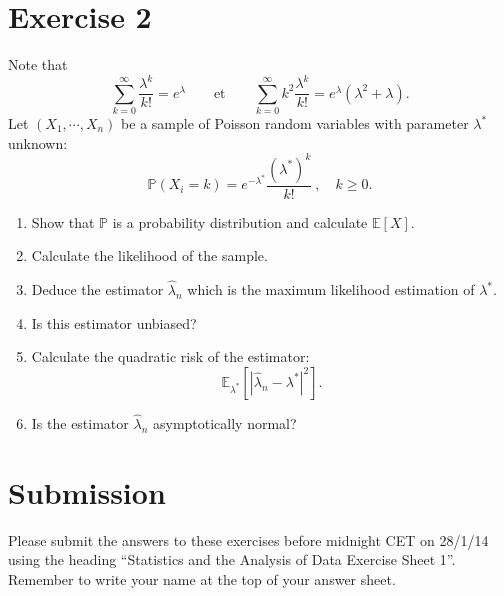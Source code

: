 \documentclass[a4paper,10pt]{article}
\begin{document}
\section*{Exercise 2}

Note that  
$$\sum_{k=0}^\infty \frac{\lambda^k}{k!} = e^\lambda\qquad\textrm{et}\qquad \sum_{k=0}^\infty k^2 \frac{ \lambda^k}{k!}=e^{\lambda}(\lambda^2 + \lambda).
$$ 
Let $(X_1,\cdots, X_n)$ be a sample of Poisson random variables with parameter $\lambda^*$ unknown:
$$
\mathbb{P}(X_i=k) = e^{-\lambda^*} \frac{(\lambda^*)^k}{k!}\ ,\quad k\ge 0.
$$
\begin{enumerate}
\item Show that $\mathbb{P}$ is a probability distribution and calculate $\mathbb{E}[X]$.
\item Calculate the likelihood of the sample. 
\item Deduce the estimator $\hat{\lambda}_n$ which is the maximum likelihood estimation of $\lambda^*$.
\item Is this estimator unbiased? 
\item Calculate the quadratic risk of the estimator:
$$
\mathbb{E}_{\lambda^*}\left[ \left| \hat \lambda_n -\lambda^*\right|^2\right].
$$
\item Is the estimator $\hat \lambda_n$  asymptotically normal?
\end{enumerate}

\section*{Submission}

Please submit the answers to these exercises before midnight CET on 28/1/14 using the heading ``Statistics and the Analysis of Data Exercise Sheet 1''. Remember to write your name at the top of your answer sheet. 
\end{document}

